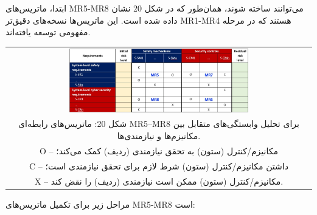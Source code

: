 \documentclass[a4paper,10pt]{article}
\begin{document}
                ابتدا، ماتریس‌های MR5-MR8 می‌توانند ساخته شوند، همان‌طور که در شکل 20 نشان داده شده است. این ماتریس‌ها نسخه‌های دقیق‌تر MR1-MR4 هستند که در مرحله مفهومی توسعه یافته‌اند.

                \begin{table}
            
                    \centering
                    \begin{tabular}{ c }
                        
                        \includegraphics[width=0.6\textwidth]{Image/fig20.jpg} \\
        
                        شکل 20: ماتریس‌های رابطه‌ای MR5–MR8 برای تحلیل وابستگی‌های متقابل بین مکانیزم‌ها و نیازمندی‌ها.\\
                        
                        O – مکانیزم/کنترل (ستون) به تحقق نیازمندی (ردیف) کمک می‌کند؛\\
                        
                        C – داشتن مکانیزم/کنترل (ستون) شرط لازم برای تحقق نیازمندی است؛\\
                        
                        X – مکانیزم/کنترل (ستون) ممکن است نیازمندی (ردیف) را نقض کند.
    
                    \end{tabular}
        
                \end{table}

                مراحل زیر برای تکمیل ماتریس‌های MR5-MR8 است:
\end{document}
